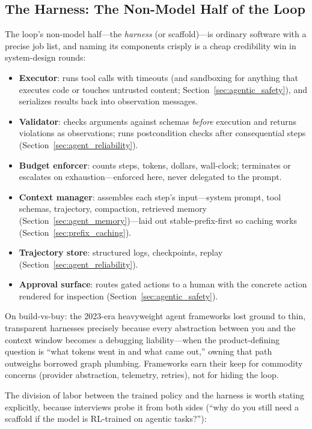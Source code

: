 \subsection{The Harness: The Non-Model Half of the Loop}

The loop's non-model half---the \textit{harness} (or scaffold)---is ordinary software with a precise job list, and naming its components crisply is a cheap credibility win in system-design rounds:

\begin{itemize}
    \item \textbf{Executor}: runs tool calls with timeouts (and sandboxing for anything that executes code or touches untrusted content; Section~\ref{sec:agentic_safety}), and serializes results back into observation messages.
    \item \textbf{Validator}: checks arguments against schemas \textit{before} execution and returns violations as observations; runs postcondition checks after consequential steps (Section~\ref{sec:agent_reliability}).
    \item \textbf{Budget enforcer}: counts steps, tokens, dollars, wall-clock; terminates or escalates on exhaustion---enforced here, never delegated to the prompt.
    \item \textbf{Context manager}: assembles each step's input---system prompt, tool schemas, trajectory, compaction, retrieved memory (Section~\ref{sec:agent_memory})---laid out stable-prefix-first so caching works (Section~\ref{sec:prefix_caching}).
    \item \textbf{Trajectory store}: structured logs, checkpoints, replay (Section~\ref{sec:agent_reliability}).
    \item \textbf{Approval surface}: routes gated actions to a human with the concrete action rendered for inspection (Section~\ref{sec:agentic_safety}).
\end{itemize}

On build-vs-buy: the 2023-era heavyweight agent frameworks lost ground to thin, transparent harnesses precisely because every abstraction between you and the context window becomes a debugging liability---when the product-defining question is ``what tokens went in and what came out,'' owning that path outweighs borrowed graph plumbing. Frameworks earn their keep for commodity concerns (provider abstraction, telemetry, retries), not for hiding the loop.

The division of labor between the trained policy and the harness is worth stating explicitly, because interviews probe it from both sides (``why do you still need a scaffold if the model is RL-trained on agentic tasks?''):

